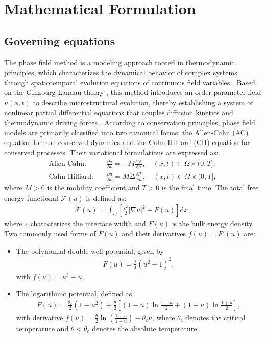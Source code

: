 \documentclass[11pt,reqno]{amsart}
\begin{document}
\section{Mathematical Formulation}

\subsection{Governing equations}
The phase field method is a modeling approach rooted in thermodynamic principles, which characterizes the dynamical behavior of complex systems through spatiotemporal evolution equations of continuous field variables \cite{steinbach2009phase}. Based on the Ginzburg-Landau theory \cite{ginzburg2009theory}, this method introduces an order parameter field $u(x,t)$ to describe microstructural evolution, thereby establishing a system of nonlinear partial differential equations that couples diffusion kinetics and thermodynamic driving forces \cite{chen2002phase}. According to conservation principles, phase field models are primarily classified into two canonical forms: the Allen-Cahn (AC) equation for non-conserved dynamics and the Cahn-Hilliard (CH) equation for conserved processes. Their variational formulations are expressed as:
\begin{align*}
	\text{Allen-Cahn:} & \quad \frac{\partial u}{\partial t} = -M \frac{\delta \mathcal{F}}{\delta u}, \quad (x,t) \in \Omega \times (0,T], \\
	\text{Cahn-Hilliard:} & \quad \frac{\partial u}{\partial t} = M \Delta \frac{\delta \mathcal{F}}{\delta u}, \quad (x,t) \in \Omega \times (0,T], 
\end{align*}
where $M > 0$ is the mobility coefficient and $T > 0$ is the final time. The total free energy functional $\mathcal{F}(u)$ is defined as:
\begin{align}
	\label{equ:energy_func}
	\mathcal{F}(u) = \int_{\Omega} \left[ \frac{\varepsilon^2}{2}|\nabla u|^2 + F(u) \right] \mathrm{d} x,
\end{align}
where $\varepsilon$ characterizes the interface width and $F(u)$ is the bulk energy density. Two commonly used forms of $F(u)$ and their derivatives $f(u) = F'(u)$ are:
\begin{itemize}
\item The polynomial double-well potential, given by
		\begin{align}\label{doubwell}
			F(u) = \frac{1}{4}(u^2-1)^2, 
		\end{align}
with $f(u) = u^3 - u$.

\item  The logarithmic potential, defined as
		\begin{align}\label{logpot}
			F(u) = \frac{\theta_c}{2}(1-u^2) + \frac{\theta}{2} \left[ (1-u)\ln\frac{1-u}{2} + (1+u)\ln\frac{1+u}{2} \right],
		\end{align}
with derivative $f(u) = \frac{\theta}{2} \ln \left( \frac{1+u}{1-u} \right) - \theta_c u$, where $\theta_c$ denotes the critical temperature and $\theta < \theta_c$ denotes the absolute temperature.
\end{itemize}
\end{document}
